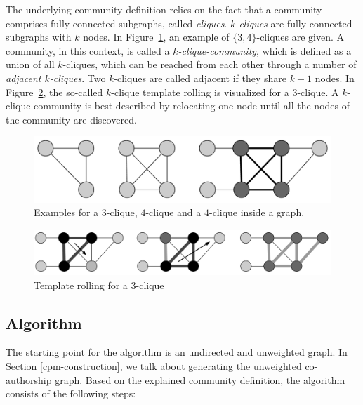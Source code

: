 \documentclass[runningheads,a4paper]{llncs}
\begin{document}
The underlying community definition relies on the fact that a community comprises fully connected subgraphs, called \emph{cliques}.
\emph{$k$-cliques} are fully connected subgraphs with $k$ nodes.
In Figure~\ref{fig:cliques}, an example of $\{3,4\}$-cliques are given.
A community, in this context, is called a \emph{$k$-clique-community}, which is defined as a union of all $k$-cliques, which can be reached from each other through a number of \emph{adjacent $k$-cliques}.
Two $k$-cliques are called adjacent if they share $k-1$ nodes.
In Figure~\ref{fig:rolling}, the so-called $k$-clique template rolling is visualized for a $3$-clique.
A $k$-clique-community is best described by relocating one node until all the nodes of the community are discovered.

\begin{figure}
	\includegraphics[width=\textwidth]{img/cliques.png}
    \caption{Examples for a $3$-clique, $4$-clique and a $4$-clique inside a graph.}
    \label{fig:cliques}
\end{figure}

\begin{figure}
	\includegraphics[width=\textwidth]{img/rolling.png}
	\caption{Template rolling for a $3$-clique}
	\label{fig:rolling}
\end{figure}

\subsection{Algorithm}
\label{cpm-algo}
The starting point for the algorithm is an undirected and unweighted graph. In Section \ref{cpm-construction}, we talk about generating the unweighted co-authorship graph.
Based on the explained community definition, the algorithm consists of the following steps:

\medskip
\end{document}
